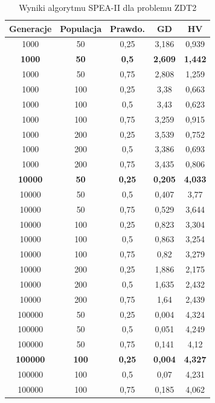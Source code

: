 \documentclass{classrep}
\begin{document}
\begin{table}[H]
\centering
\caption{Wyniki algorytmu SPEA-II dla problemu ZDT2}
\label{tab:SPEAII_ZDT2}
\begin{tabular}{|ccc|c|c|}
\hline
\textbf{Generacje} & \textbf{Populacja} & \textbf{Prawdo.} & \textbf{GD} & \textbf{HV} \\ \hline
1000 & 50 & 0,25 & 3,186 & 0,939 \\ \hline
\textbf{1000} & \textbf{50} & \textbf{0,5} & \textbf{2,609} & \textbf{1,442} \\ \hline
1000 & 50 & 0,75 & 2,808 & 1,259 \\ \hline
1000 & 100 & 0,25 & 3,38 & 0,663 \\ \hline
1000 & 100 & 0,5 & 3,43 & 0,623 \\ \hline
1000 & 100 & 0,75 & 3,259 & 0,915 \\ \hline
1000 & 200 & 0,25 & 3,539 & 0,752 \\ \hline
1000 & 200 & 0,5 & 3,386 & 0,693 \\ \hline
1000 & 200 & 0,75 & 3,435 & 0,806 \\ \hline
\textbf{10000} & \textbf{50} & \textbf{0,25} & \textbf{0,205} & \textbf{4,033} \\ \hline
10000 & 50 & 0,5 & 0,407 & 3,77 \\ \hline
10000 & 50 & 0,75 & 0,529 & 3,644 \\ \hline
10000 & 100 & 0,25 & 0,823 & 3,304 \\ \hline
10000 & 100 & 0,5 & 0,863 & 3,254 \\ \hline
10000 & 100 & 0,75 & 0,82 & 3,279 \\ \hline
10000 & 200 & 0,25 & 1,886 & 2,175 \\ \hline
10000 & 200 & 0,5 & 1,635 & 2,432 \\ \hline
10000 & 200 & 0,75 & 1,64 & 2,439 \\ \hline
100000 & 50 & 0,25 & 0,004 & 4,324 \\ \hline
100000 & 50 & 0,5 & 0,051 & 4,249 \\ \hline
100000 & 50 & 0,75 & 0,141 & 4,12 \\ \hline
\textbf{100000} & \textbf{100} & \textbf{0,25} & \textbf{0,004} & \textbf{4,327} \\ \hline
100000 & 100 & 0,5 & 0,07 & 4,231 \\ \hline
100000 & 100 & 0,75 & 0,185 & 4,062 \\ \hline
\end{tabular}
\end{table}
\end{document}
